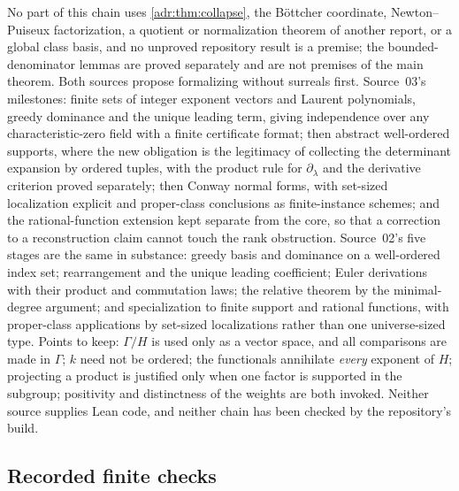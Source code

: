 \documentclass[11pt,letterpaper]{article}
\numberwithin{equation}{section}
\theoremstyle{definition}
\theoremstyle{remark}
\begin{document}
No part of this chain uses \cref{adr:thm:collapse}, the B\"ottcher
coordinate, Newton--Puiseux factorization, a quotient or normalization theorem
of another report, or a global class basis, and no unproved repository result
is a premise; the bounded-denominator lemmas are proved separately and are not
premises of the main theorem. Both sources propose formalizing without
surreals first. Source~03's milestones: finite sets of integer exponent vectors
and Laurent polynomials, greedy dominance and the unique leading term, giving
independence over any characteristic-zero field with a finite certificate
format; then abstract well-ordered supports, where the new obligation is the
legitimacy of collecting the determinant expansion by ordered tuples, with the
product rule for $\partial_\lambda$ and the derivative criterion proved
separately; then Conway normal forms, with set-sized localization explicit and
proper-class conclusions as finite-instance schemes; and the rational-function
extension kept separate from the core, so that a correction to a
reconstruction claim cannot touch the rank obstruction. Source~02's five
stages are the same in substance: greedy basis and dominance on a well-ordered
index set; rearrangement and the unique leading coefficient; Euler derivations
with their product and commutation laws; the relative theorem by the
minimal-degree argument; and specialization to finite support and rational
functions, with proper-class applications by set-sized localizations rather
than one universe-sized type. Points to keep: $\Gamma/H$ is used only as a
vector space, and all comparisons are made in $\Gamma$; $k$ need not be ordered;
the functionals annihilate \emph{every} exponent of $H$; projecting a product
is justified only when one factor is supported in the subgroup; positivity and
distinctness of the weights are both invoked. Neither source supplies Lean
code, and neither chain has been checked by the repository's build.

\subsection{Recorded finite checks}
\label{adr:sr:sec:checks}
\end{document}
